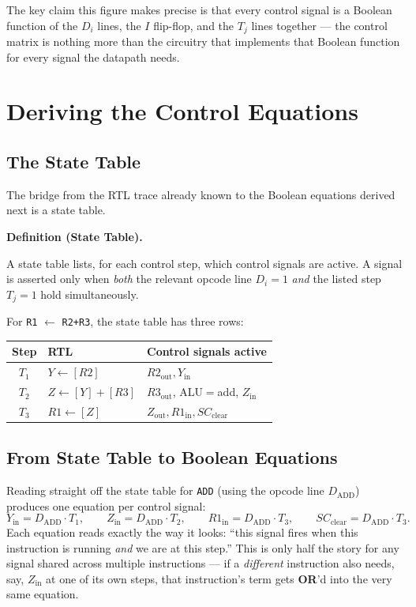 \documentclass[11pt]{article}
\newenvironment{definitionbox}[1]{%
  \par\noindent\textbf{Definition (#1).}\ \itshape
}{\par\vspace{0.3em}}
\begin{document}
The key claim this figure makes precise is that every control signal is a Boolean function of the $D_i$ lines, the $I$ flip-flop, and the $T_j$ lines together --- the control matrix is nothing more than the circuitry that implements that Boolean function for every signal the datapath needs.

\section{Deriving the Control Equations}
\label{sec:equations}

\subsection{The State Table}

The bridge from the RTL trace already known to the Boolean equations derived next is a state table.

\begin{definitionbox}{State Table}
A state table lists, for each control step, which control signals are active. A signal is asserted only when \emph{both} the relevant opcode line $D_i = 1$ \emph{and} the listed step $T_j = 1$ hold simultaneously.
\end{definitionbox}

For \texttt{R1} $\gets$ \texttt{R2+R3}, the state table has three rows:

\begin{center}
\footnotesize
\begin{tabular}{@{}cll@{}}
\toprule
\textbf{Step} & \textbf{RTL} & \textbf{Control signals active} \\
\midrule
$T_1$ & $Y \gets [R2]$            & $R2_{\text{out}}, Y_{\text{in}}$ \\
$T_2$ & $Z \gets [Y] + [R3]$      & $R3_{\text{out}}$, ALU$=$add, $Z_{\text{in}}$ \\
$T_3$ & $R1 \gets [Z]$            & $Z_{\text{out}}, R1_{\text{in}}, SC_{\text{clear}}$ \\
\bottomrule
\end{tabular}
\end{center}

\subsection{From State Table to Boolean Equations}

Reading straight off the state table for \texttt{ADD} (using the opcode line $D_{\text{ADD}}$) produces one equation per control signal:
\[
  Y_{\text{in}} = D_{\text{ADD}} \cdot T_1, \qquad
  Z_{\text{in}} = D_{\text{ADD}} \cdot T_2, \qquad
  R1_{\text{in}} = D_{\text{ADD}} \cdot T_3, \qquad
  SC_{\text{clear}} = D_{\text{ADD}} \cdot T_3.
\]
Each equation reads exactly the way it looks: ``this signal fires when this instruction is running \emph{and} we are at this step.'' This is only half the story for any signal shared across multiple instructions --- if a \emph{different} instruction also needs, say, $Z_{\text{in}}$ at one of its own steps, that instruction's term gets \textbf{OR}'d into the very same equation.
\end{document}
